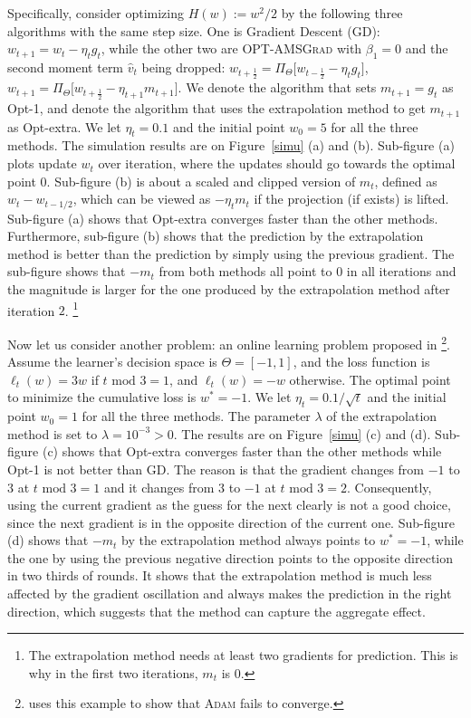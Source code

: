 \documentclass[11pt]{article}
\theoremstyle{k}
\begin{document}
Specifically, consider optimizing $H(w) := w^2/2 $ 
by the following three algorithms with the same step size.
One is Gradient Descent (GD): $w_{t+1} = w_t - \eta_t g_t$,
while the other two are
\textsc{OPT-AMSGrad} with $\beta_1=0$ and the second moment term $\hat{v}_t$ being dropped: 
$w_{t+\frac{1}{2}} = \Pi_{\Theta}\big[ w_{t-\frac{1}{2}} - \eta_t g_t \big]$,
$w_{t+1} = \Pi_{\Theta}\big[ w_{t+\frac{1}{2}} - \eta_{t+1} m_{t+1} \big]$.
We denote the algorithm that sets $m_{t+1}= g_t$ as Opt-1,
and denote the algorithm that uses the extrapolation method
to get $m_{t+1}$ as Opt-extra.
We let $\eta_t=0.1$ and the initial point $w_0=5$ for all the three methods. 
The simulation results are on Figure~\ref{simu} (a) and (b). Sub-figure (a) plots update $w_t$ over iteration, where the updates should go towards the optimal point $0$.
Sub-figure (b) is about a scaled and clipped version of $m_t$, defined as $w_t - w_{t-1/2}$,
which can be viewed as $- \eta_t m_{t}$ if the projection (if exists) is lifted.
Sub-figure (a) shows that Opt-extra converges faster than the other methods. 
Furthermore, sub-figure (b) shows that the prediction by the extrapolation
method is better than the prediction by simply using the previous gradient. The sub-figure shows that
$-m_t$ from both methods all point to $0$ in all iterations and the magnitude is larger for the one produced by the extrapolation method after iteration $2$. \footnote{
The extrapolation method needs at least two gradients for prediction.
This is why in the first two iterations, $m_t$ is $0$.}




Now let us consider another problem: an online learning problem proposed in \citep{RKK18}
\footnote{\citep{RKK18} uses this example to show that \textsc{Adam} \citep{KB15} fails to converge.}.
Assume the learner's decision space is $\Theta=[-1,1]$, and
the loss function is $\ell_t(w) = 3 w$ if $t \text{ mod } 3 = 1$,
and $\ell_t(w) = - w$ otherwise.
The optimal point to minimize the cumulative loss is $w^*=-1$.
We let $\eta_t=0.1 / \sqrt{t}$ and the initial point $w_0=1$ for all the three methods.
The parameter $\lambda$ of the extrapolation method is set to $\lambda=10^{-3}>0$.
The results are on Figure~\ref{simu} (c) and (d).
Sub-figure (c) shows that Opt-extra converges faster than the other methods
while Opt-1 is not better than GD.
The reason is that the gradient changes from $-1$ to $3$ at $t \text{ mod } 3 = 1$
and it changes from $3$ to $-1$ at $t \text{ mod } 3 = 2$.
Consequently, using the current gradient as the guess for the next clearly is not a good choice,
since the next gradient is in the opposite direction of the current one.
Sub-figure (d) shows that $-m_t$ by the extrapolation method always points to
$w^*=-1$, while the one by using the previous negative direction points to the opposite direction in two thirds of rounds. It shows that the extrapolation method is much less affected by the gradient oscillation and always makes the prediction in the right direction, which suggests that the method can capture the aggregate effect.
\end{document}
